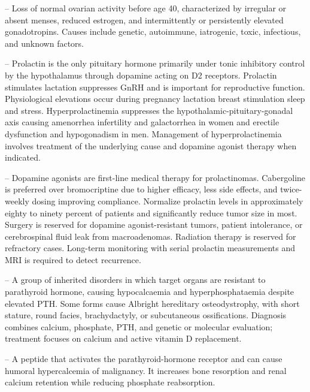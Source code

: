 -- Loss of normal ovarian activity before age 40, characterized by irregular or absent menses, reduced estrogen, and intermittently or persistently elevated gonadotropins. Causes include genetic, autoimmune, iatrogenic, toxic, infectious, and unknown factors.

-- Prolactin is the only pituitary hormone primarily under tonic inhibitory control by the hypothalamus through dopamine acting on D2 receptors. Prolactin stimulates lactation suppresses GnRH and is important for reproductive function. Physiological elevations occur during pregnancy lactation breast stimulation sleep and stress. Hyperprolactinemia suppresses the hypothalamic-pituitary-gonadal axis causing amenorrhea infertility and galactorrhea in women and erectile dysfunction and hypogonadism in men. Management of hyperprolactinemia involves treatment of the underlying cause and dopamine agonist therapy when indicated.

-- Dopamine agonists are first-line medical therapy for prolactinomas. Cabergoline is preferred over bromocriptine due to higher efficacy, less side effects, and twice-weekly dosing improving compliance. Normalize prolactin levels in approximately eighty to ninety percent of patients and significantly reduce tumor size in most. Surgery is reserved for dopamine agonist-resistant tumors, patient intolerance, or cerebrospinal fluid leak from macroadenomas. Radiation therapy is reserved for refractory cases. Long-term monitoring with serial prolactin measurements and MRI is required to detect recurrence.

-- A group of inherited disorders in which target organs are resistant to parathyroid hormone, causing hypocalcaemia and hyperphosphataemia despite elevated PTH. Some forms cause Albright hereditary osteodystrophy, with short stature, round facies, brachydactyly, or subcutaneous ossifications. Diagnosis combines calcium, phosphate, PTH, and genetic or molecular evaluation; treatment focuses on calcium and active vitamin D replacement.

-- A peptide that activates the parathyroid-hormone receptor and can cause humoral hypercalcemia of malignancy. It increases bone resorption and renal calcium retention while reducing phosphate reabsorption.

